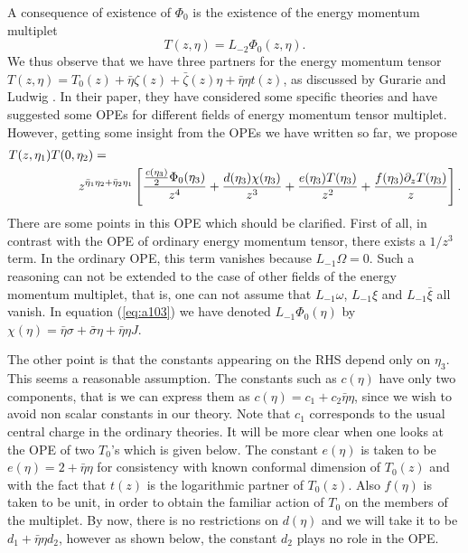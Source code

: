 \documentclass[a4paper,11pt]{article}
\begin{document}
A consequence of existence of $\Phi_0$ is the existence of the
energy momentum multiplet
\begin{equation}\label{eq:a102}
T(z,\eta)=L_{-2} \Phi_0(z,\eta).
\end{equation}
We thus observe that we have three partners for the energy
momentum tensor $T(z,\eta)=T_0(z)+\bar{\eta}
\zeta(z)+\bar{\zeta}(z)\eta + \bar{\eta}\eta t(z)$, as discussed
by Gurarie and Ludwig \cite{lud}. In their paper, they have
considered some specific theories and have suggested some OPEs for
different fields of energy momentum tensor multiplet. However,
getting some insight from the OPEs we have written so far, we
propose
\begin{eqnarray}\label{eq:a103}
T(z,\eta_1)T(0,\eta_2) = \hspace{100mm}\nonumber \\
 z^{ \bar{\eta}_1 \eta_2 + \bar{\eta}_2
\eta_1} \left[ \frac{\frac{c(\eta_3)}{2}\Phi_0(\eta_3)}{z^{4}} +
\frac{d(\eta_3)\chi(\eta_3)}{z^3}+
\frac{e(\eta_3)T(\eta_3)}{z^{2}} + \frac{f(\eta_3)
\partial_z{T(\eta_3)}}{z}\right].
\end{eqnarray}
There are some points in this OPE which should be clarified.
First of all, in contrast with the OPE of ordinary energy momentum
tensor, there exists a $1/z^3$ term. In the ordinary OPE, this
term vanishes because $L_{-1}\Omega=0$. Such a reasoning can not
be extended to the case of other fields of the energy momentum
multiplet, that is, one can not assume that $L_{-1}\omega$,
$L_{-1}\xi$ and $L_{-1}\bar{\xi}$ all vanish. In equation
(\ref{eq:a103}) we have denoted $L_{-1}\Phi_0(\eta)$ by
$\chi(\eta)=\bar{\eta}\sigma + \bar{\sigma}\eta + \bar{\eta}\eta
J $.

 The other point is that the constants appearing on the RHS
depend only on $\eta_3$. This seems a reasonable assumption. The
constants such as $c(\eta)$ have only two components, that is we
can express them as $c(\eta)=c_1+c_2 \bar{\eta} \eta$, since we
wish to avoid non scalar constants in our theory. Note that $c_1$
corresponds to the usual central charge in the ordinary theories.
It will be more clear when one looks at the OPE of two $T_0$'s
which is given below. The constant $e(\eta)$ is taken to be
$e(\eta)=2+\bar{\eta} \eta$ for consistency with known conformal
dimension of $T_0(z)$ and with the fact that $t(z)$ is the
logarithmic partner of $T_0(z)$. Also $f(\eta)$ is taken to be
unit, in order to obtain the familiar action of $T_{0}$ on the
members of the multiplet. By now, there is no restrictions on
$d(\eta)$ and we will take it to be $d_1+\bar{\eta}\eta d_2$,
however as shown below, the constant $d_2$ plays no role in the
OPE.
\end{document}
